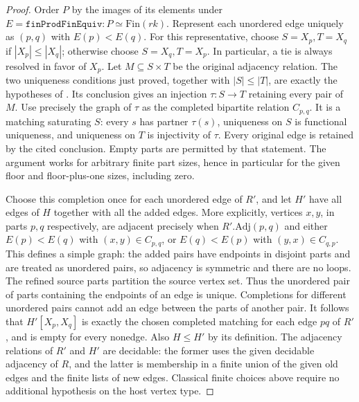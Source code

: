 \begin{proof}
Order $P$ by the images of its elements under
$E=\texttt{finProdFinEquiv}:P\simeq\mathrm{Fin}(rk)$.
Represent each unordered edge uniquely as $(p,q)$ with $E(p)<E(q)$.
For this representative, choose $S=X_p,T=X_q$ if $|X_p|\leq|X_q|$;
otherwise choose $S=X_q,T=X_p$.  In particular, a tie is always
resolved in favor of $X_p$.  Let $M\subseteq S\times T$ be the
original adjacency relation.  The two uniqueness conditions just
proved, together with $|S|\leq|T|$, are exactly the hypotheses of
.  Its conclusion gives an
injection $\tau:S\to T$ retaining every pair of $M$.
Use precisely the graph of $\tau$ as the completed bipartite relation
$C_{p,q}$.  It is a matching saturating $S$: every $s$ has partner
$\tau(s)$, uniqueness on $S$ is functional uniqueness, and uniqueness
on $T$ is injectivity of $\tau$.  Every original edge is retained by
the cited conclusion.  Empty parts are permitted by that statement.
The argument works for arbitrary finite part sizes, hence in particular
for the given floor and floor-plus-one sizes, including zero.

Choose this completion once for each unordered edge of $R'$, and let
$H'$ have all edges of $H$ together with all the added edges.
More explicitly, vertices $x,y$, in parts $p,q$ respectively, are
adjacent precisely when $R'.\mathrm{Adj}(p,q)$ and either
$E(p)<E(q)$ with $(x,y)\in C_{p,q}$, or $E(q)<E(p)$ with
$(y,x)\in C_{q,p}$.
This defines a simple graph: the added pairs have endpoints in
disjoint parts and are treated as unordered pairs, so adjacency is
symmetric and there are no loops.  The refined source parts partition
the source vertex set.  Thus the unordered pair of parts containing
the endpoints of an edge is unique.  Completions for different
unordered pairs cannot add an edge between the parts of another pair.
It follows that $H'[X_p,X_q]$ is exactly the chosen completed matching
for each edge $pq$ of $R'$, and is empty for every nonedge.  Also
$H\leq H'$ by its definition.  The adjacency relations of $R'$ and
$H'$ are decidable: the former uses the given decidable adjacency of
$R$, and the latter is membership in a finite union of the given old
edges and the finite lists of new edges.  Classical finite choices
above require no additional hypothesis on the host vertex type.


\end{proof}
